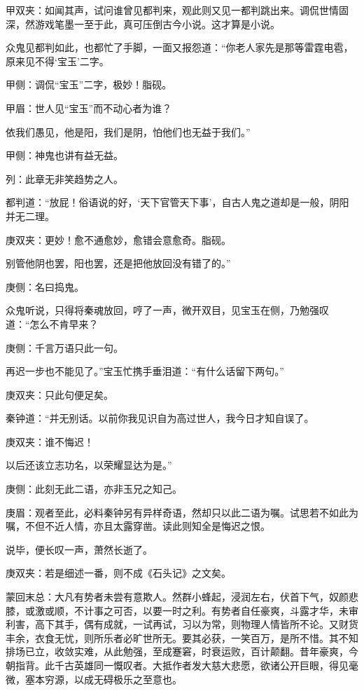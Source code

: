 \begin{parag}
\begin{note}甲双夹：如闻其声，试问谁曾见都判来，观此则又见一都判跳出来。调侃世情固深，然游戏笔墨一至于此，真可压倒古今小说。这才算是小说。\end{note}众鬼见都判如此，也都忙了手脚，一面又报怨道：“你老人家先是那等雷霆电雹，原来见不得‘宝玉’二字。\begin{note}甲侧：调侃“宝玉”二字，极妙！脂砚。\end{note}\begin{note}甲眉：世人见“宝玉”而不动心者为谁？\end{note}依我们愚见，他是阳，我们是阴，怕他们也无益于我们。”\begin{note}甲侧：神鬼也讲有益无益。\end{note}\begin{note}列：此章无非笑趋势之人。\end{note}都判道：“放屁！俗语说的好，‘天下官管天下事’，自古人鬼之道却是一般，阴阳并无二理。\begin{note}庚双夹：更妙！愈不通愈妙，愈错会意愈奇。脂砚。\end{note}别管他阴也罢，阳也罢，还是把他放回没有错了的。”\begin{note}庚侧：名曰捣鬼。\end{note}众鬼听说，只得将秦魂放回，哼了一声，微开双目，见宝玉在侧，乃勉强叹道：“怎么不肯早来？\begin{note}庚侧：千言万语只此一句。\end{note}再迟一步也不能见了。”宝玉忙携手垂泪道：“有什么话留下两句。”\begin{note}庚双夹：只此句便足矣。\end{note}秦钟道：“并无别话。以前你我见识自为高过世人，我今日才知自误了。\begin{note}庚双夹：谁不悔迟！\end{note}以后还该立志功名，以荣耀显达为是。”\begin{note}庚侧：此刻无此二语，亦非玉兄之知己。\end{note}\begin{note}庚眉：观者至此，必料秦钟另有异样奇语，然却只以此二语为嘱。试思若不如此为嘱，不但不近人情，亦且太露穿凿。读此则知全是悔迟之恨。\end{note}说毕，便长叹一声，萧然长逝了。\begin{note}庚双夹：若是细述一番，则不成《石头记》之文矣。\end{note}
\end{parag}


\begin{parag}
    \begin{note}蒙回末总：大凡有势者未尝有意欺人。然群小蜂起，浸润左右，伏首下气，奴颜悲膝，或激或顺，不计事之可否，以要一时之利。有势者自任豪爽，斗露才华，未审利害，高下其手，偶有成就，一试再试，习以为常，则物理人情皆所不论。又财货丰余，衣食无忧，则所乐者必旷世所无。要其必获，一笑百万，是所不惜。其不知排场已立，收敛实难，从此勉强，至成蹇窘，时衰运败，百计颠翻。昔年豪爽，今朝指背。此千古英雄同一慨叹者。大抵作者发大慈大悲愿，欲诸公开巨眼，得见毫微，塞本穷源，以成无碍极乐之至意也。\end{note}
\end{parag}
